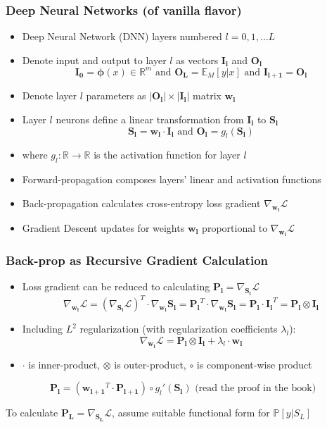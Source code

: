 \documentclass[handout]{beamer}
\begin{document}
\begin{frame}
\frametitle{Deep Neural Networks (of vanilla flavor)}
\pause
\begin{itemize}[<+->]
\item Deep Neural Network (DNN) layers numbered $l = 0, 1, \ldots L$
\item Denote input and output to layer $l$ as vectors $\bm{I_l}$ and $\bm{O_l}$
$$\bm{I_0} = \bm{\phi}(x) \in \mathbb{R}^m \text{ and } \bm{O_L} = \mathbb{E}_M[y|x] \text{ and } \bm{I_{l+1}} = \bm{O_l}$$
\item Denote layer $l$ parameters as $|\bm{O_l}| \times |\bm{I_l}|$ matrix $\bm{w_l}$
\item Layer $l$ neurons define a linear transformation from $\bm{I_l}$ to $\bm{S_l}$
$$\bm{S_l} = \bm{w_l} \cdot \bm{I_l} \text{ and } \bm{O_l} = g_l(\bm{S_l})$$
\item where $g_l: \mathbb{R} \rightarrow \mathbb{R}$ is the activation function for layer $l$
\item Forward-propagation composes layers' linear and activation functions
\item Back-propagation calculates cross-entropy loss gradient $\nabla_{\bm{w_l}} \mathcal{L}$
\item Gradient Descent updates for weights $\bm{w_l}$ proportional to $\nabla_{\bm{w_l}} \mathcal{L}$
\end{itemize}
\end{frame}

\begin{frame}
\frametitle{Back-prop as Recursive Gradient Calculation}
\pause
\begin{itemize}[<+->]
\item Loss gradient can be reduced to calculating $\bm{P_l} = \nabla_{\bm{S_l}} \mathcal{L}$
$$\nabla_{\bm{w_l}} \mathcal{L} = (\nabla_{\bm{S_l}} \mathcal{L})^T \cdot \nabla_{\bm{w_l}} \bm{S_l} = \bm{P_l}^T \cdot \nabla_{\bm{w_l}} \bm{S_l} = \bm{P_l} \cdot \bm{I_l}^T = \bm{P_l} \otimes \bm{I_l}$$
\item Including $L^2$ regularization (with regularization coefficients $\lambda_l$):
$$\nabla_{\bm{w_l}} \mathcal{L} = \bm{P_l} \otimes \bm{I_l} + \lambda_l \cdot \bm{w_l} $$
\item $\cdot$ is inner-product, $\otimes$ is outer-product, $\circ$ is component-wise product
\end{itemize}
\pause
\begin{theorem}
$$\bm{P_l} = (\bm{w_{l+1}}^T \cdot \bm{P_{l+1}}) \circ g_l'(\bm{S_l}) \text{ (read the proof in the book)}$$
\end{theorem}
\pause
To calculate $\bm{P_L} = \nabla_{\bm{S_L}} \mathcal{L}$, assume suitable functional form for $\mathbb{P}[y|S_L]$
\end{frame}
\end{document}
